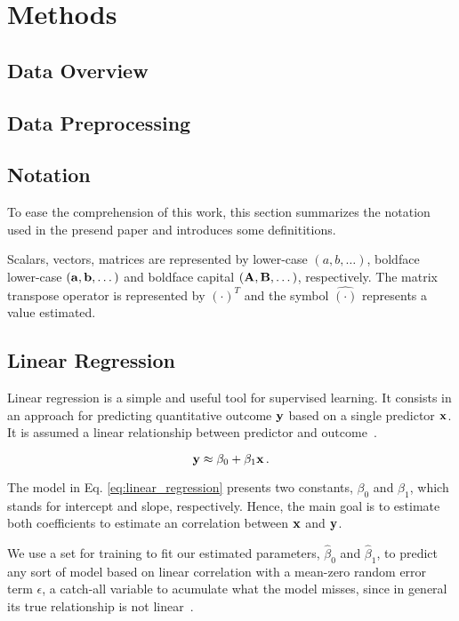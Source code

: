 \section{Methods}

\subsection{Data Overview}

\subsection{Data Preprocessing}

\subsection{Notation}
To ease the comprehension of this work, this section summarizes the notation used in the presend paper and introduces some definititions.

Scalars, vectors, matrices are represented by lower-case $(a, b, \dots)$, boldface lower-case $({\bf a}, {\bf b}, \dots)$ and boldface capital $({\bf A}, {\bf B}, \dots)$, respectively. The matrix transpose operator is represented by $(\cdot)^T$ and the symbol $\hat{(\cdot)}$ represents a value estimated.

\subsection{Linear Regression}
Linear regression is a simple and useful tool for supervised learning. It consists in an approach for predicting  quantitative outcome ${\bf y}$ based on a single predictor ${\bf x}$. It is assumed a linear relationship between predictor and outcome~\cite{James2013}.

\begin{equation}
{\bf y} \approx \beta_0 + \beta_1 {\bf x} \, . \label{eq:linear_regression}
\end{equation}

The model in Eq. \ref{eq:linear_regression} presents two constants, $\beta_0$ and $\beta_1$, which stands for intercept and slope, respectively. Hence, the main goal is to estimate both coefficients to estimate an correlation between ${\bf x}$ and ${\bf y}$.

We use a set for training to fit our estimated parameters, $\hat{\beta}_{0}$ and $\hat{\beta}_{1}$, to predict any sort of model based on linear correlation with a mean-zero random error term $\epsilon$, a catch-all variable to acumulate what the model misses, since in general its true relationship is not linear~\cite{James2013}.


